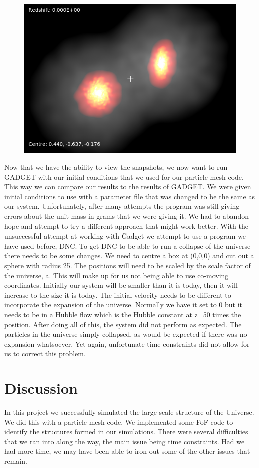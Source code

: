 \documentclass[10pt]{article}
\begin{document}
\begin{figure}[h]
\includegraphics[width=4.5in]{gadget.png}
\centering
\end{figure}


	Now that we have the ability to view the snapshots, we now want to run GADGET with our initial conditions that we used for our particle mesh code. This way we can compare our results to the results of GADGET. We were given initial conditions to use with a parameter file that was changed to be the same as our system. Unfortunately, after many attempts the program was still giving errors about the unit mass in grams that we were giving it. We had to abandon hope and attempt to try a different approach that might work better. With the unsuccessful attempt at working with Gadget we attempt to use a program we have used before, DNC. 
	To get DNC to be able to run a collapse of the universe there needs to be some changes. We need to centre a box at (0,0,0) and cut out a sphere with radius 25.  The positions will need to be scaled by the scale factor of the universe, a. This will make up for us not being able to use co-moving coordinates. Initially our system will be smaller than it is today, then it will increase to the size it is today. The initial velocity needs to be different to incorporate the expansion of the universe. Normally we have it set to 0 but it needs to be in a Hubble flow which is the Hubble constant at z=50 times the position.
	After doing all of this, the system did not perform as expected. The particles in the universe simply collapsed, as would be expected if there was no expansion whatsoever. Yet again, unfortunate time constraints did not allow for us to correct this problem.


\section{Discussion}
	In this project we successfully simulated the large-scale structure of the Universe. We did this with a particle-mesh code. We implemented some FoF code to identify the structures formed in our simulations. There were several difficulties that we ran into along the way, the main issue being time constraints. Had we had more time, we may have been able to iron out some of the other issues that remain. 
\end{document}

